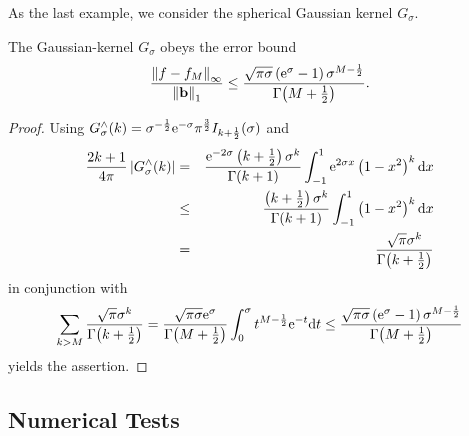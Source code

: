 As the last example, we consider the spherical Gaussian kernel $G_{\sigma}$. 

\begin{lemma}
  The Gaussian-kernel $G_{\sigma}$ obeys the error bound
  \begin{equation}
    \label{error:G}
    \frac{\left\|f - f_{M}\right\|_{\infty}}{\left\|\mathbf{b}\right\|_1} \le
    \frac{\sqrt{\pi\sigma}\left(\mbox{\rm{e}}^{\sigma}-1\right) \sigma^{M-\frac{1}{2}}}{\Gamma{\hspace{-0.4ex}}\left(M
    +\frac{1}{2}\right)}.
  \end{equation} 
\end{lemma}
\begin{proof}
  Using $G_{\sigma}^{\wedge}{\hspace{-0.4ex}}\left(k\right) = \sigma^{-\frac{1}{2}} \mbox{\rm{e}}^{-\sigma}
  \pi^{\frac{3}{2}} I_{k+\frac{1}{2}}{\hspace{-0.4ex}}\left(\sigma\right)$ and
  \begin{eqnarray*}
    \frac{2k+1}{4\pi} \left\vert G_{\sigma}^{\wedge}{\hspace{-0.4ex}}\left(k\right)\right\vert
    &=&
    \frac{\mbox{\rm{e}}^{-2\sigma}
    \left(k+\frac{1}{2}\right)\sigma^k}{\Gamma{\hspace{-0.4ex}}\left(k+1\right)} \int_{-1}^{1}
    \mbox{\rm{e}}^{2\sigma x} \left(1-x^2\right)^k \text{\rm{d}} x\\
    &\le&
    \frac{\left(k+\frac{1}{2}\right)\sigma^k}{\Gamma{\hspace{-0.4ex}}\left(k+1\right)}
    \int_{-1}^{1} \left(1-x^2\right)^k \text{\rm{d}} x\\
    &=&
    \frac{\sqrt{\pi}\sigma^k}{\Gamma{\hspace{-0.4ex}}\left(k+\frac{1}{2}\right)}
  \end{eqnarray*}
  in conjunction with
  \begin{equation*}
    \sum_{k>M} \frac{\sqrt{\pi}\sigma^k}{\Gamma{\hspace{-0.4ex}}\left(k+\frac{1}{2}\right)}\\
    =
    \frac{\sqrt{\pi\sigma}\mbox{\rm{e}}^{\sigma}}{\Gamma{\hspace{-0.4ex}}\left(M+\frac{1}{2}\right)} 
    \int_{0}^{\sigma} t^{M-\frac{1}{2}} \mbox{\rm{e}}^{-t} \text{\rm{d}} t\\
    \le
    \frac{\sqrt{\pi\sigma}\left(\mbox{\rm{e}}^{\sigma}-1\right) \sigma^{M-\frac{1}{2}}}{\Gamma{\hspace{-0.4ex}}\left(M
    +\frac{1}{2}\right)}
  \end{equation*}
  yields the assertion.
\end{proof}

\subsection{Numerical Tests}

